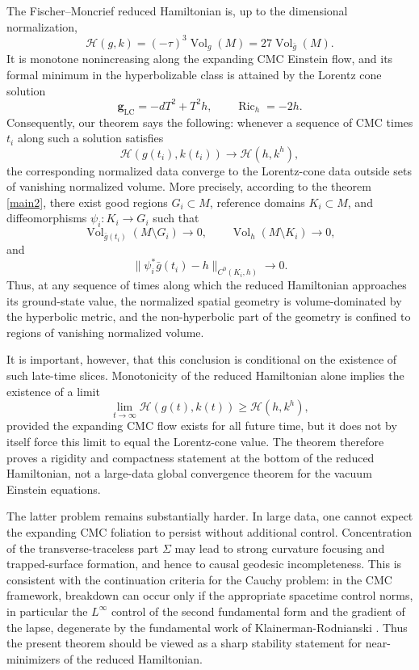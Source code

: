 \documentclass{amsart}
\begin{document}
\noindent The Fischer--Moncrief reduced Hamiltonian is, up to the dimensional
normalization,
\[
        \mathcal H(g,k)=(-\tau)^3\operatorname{Vol}_g(M)
        =
        27\operatorname{Vol}_{\bar g}(M).
\]
It is monotone nonincreasing along the expanding CMC Einstein flow, and its
formal minimum in the hyperbolizable class is attained by the Lorentz cone
solution
\[
        \mathbf g_{\mathrm{LC}}
        =
        -dT^2+T^2h,
        \qquad
        \operatorname{Ric}_h=-2h .
\]
Consequently, our theorem says the following: whenever a sequence of CMC
times \(t_i\) along such a solution satisfies
\[
        \mathcal H(g(t_i),k(t_i))
        \longrightarrow
        \mathcal H(h,k^h),
\]
the corresponding normalized data converge to the Lorentz-cone data outside
sets of vanishing normalized volume.  More precisely, according to the theorem \ref{main2}, there exist good
regions \(G_i\subset M\), reference domains \(K_i\subset M\), and
diffeomorphisms
$\psi_i:K_i\to G_i$
such that
\[
        \operatorname{Vol}_{\bar g(t_i)}(M\setminus G_i)\to0,
        \qquad
        \operatorname{Vol}_h(M\setminus K_i)\to0,
\]
and
\[
        \|\psi_i^*\bar g(t_i)-h\|_{C^0(K_i,h)}\to0 .
\]
Thus, at any sequence of times along which the reduced Hamiltonian approaches
its ground-state value, the normalized spatial geometry is volume-dominated
by the hyperbolic metric, and the non-hyperbolic part of the geometry is
confined to regions of vanishing normalized volume.


\noindent It is important, however, that this conclusion is conditional on the
existence of such late-time slices.  Monotonicity of the reduced Hamiltonian
alone implies the existence of a limit
\[
        \lim_{t\to\infty}\mathcal H(g(t),k(t))
        \geq
        \mathcal H(h,k^h),
\]
provided the expanding CMC flow exists for all future time, but it does not
by itself force this limit to equal the Lorentz-cone value.  The theorem
therefore proves a rigidity and compactness statement at the bottom of the
reduced Hamiltonian, not a large-data global convergence theorem for the
vacuum Einstein equations.

The latter problem remains substantially harder.  In large data, one cannot
expect the expanding CMC foliation to persist without additional control.
Concentration of the transverse-traceless part \(\Sigma\) may lead to strong
curvature focusing and trapped-surface formation, and hence to causal
geodesic incompleteness.  This is consistent with the continuation criteria
for the Cauchy problem: in the CMC framework, breakdown can occur only if the
appropriate spacetime control norms, in particular the \(L^\infty\) control
of the second fundamental form and the gradient of the lapse, degenerate by the fundamental work of Klainerman-Rodnianski \cite{klainerman2010breakdown}.
Thus the present theorem should be viewed as a sharp stability statement for
near-minimizers of the reduced Hamiltonian.
\end{document}
